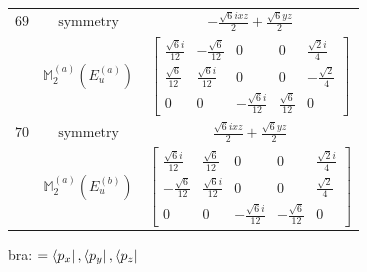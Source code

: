 \documentclass[fleqn,8pt,landscape]{jsarticle}
\begin{document}
\begin{longtable}{ccc}
$ 69 $ & $ \text{symmetry} $ & $ - \frac{\sqrt{6} i x z}{2} + \frac{\sqrt{6} y z}{2} $ \\
$  $ & $ \mathbb{M}_{2}^{(a)}(E_{u}^{(a)}) $ & $ \begin{bmatrix} \frac{\sqrt{6} i}{12} & - \frac{\sqrt{6}}{12} & 0 & 0 & \frac{\sqrt{2} i}{4} \\ \frac{\sqrt{6}}{12} & \frac{\sqrt{6} i}{12} & 0 & 0 & - \frac{\sqrt{2}}{4} \\ 0 & 0 & - \frac{\sqrt{6} i}{12} & \frac{\sqrt{6}}{12} & 0 \end{bmatrix} $ \\ \hline
$ 70 $ & $ \text{symmetry} $ & $ \frac{\sqrt{6} i x z}{2} + \frac{\sqrt{6} y z}{2} $ \\
$  $ & $ \mathbb{M}_{2}^{(a)}(E_{u}^{(b)}) $ & $ \begin{bmatrix} \frac{\sqrt{6} i}{12} & \frac{\sqrt{6}}{12} & 0 & 0 & \frac{\sqrt{2} i}{4} \\ - \frac{\sqrt{6}}{12} & \frac{\sqrt{6} i}{12} & 0 & 0 & \frac{\sqrt{2}}{4} \\ 0 & 0 & - \frac{\sqrt{6} i}{12} & - \frac{\sqrt{6}}{12} & 0 \end{bmatrix} $ \\ \hline
\end{longtable}
bra: $=\bra{p_{x}}, \bra{p_{y}}, \bra{p_{z}}$
\end{document}
